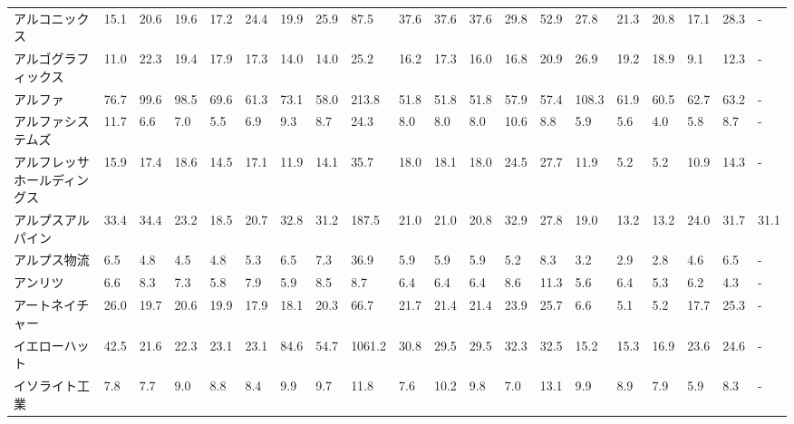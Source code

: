 \begin{tabular}{llllllllllllllllllll}
アルコニックス         &   15.1 &   20.6 &      19.6 &      17.2 &       24.4 &    19.9 &    25.9 &     87.5 &    37.6 &    37.6 &   37.6 &   29.8 &    52.9 &    27.8 &    21.3 &   20.8 &   17.1 &    28.3 &      - \\
アルゴグラフィックス      &   11.0 &   22.3 &      19.4 &      17.9 &       17.3 &    14.0 &    14.0 &     25.2 &    16.2 &    17.3 &   16.0 &   16.8 &    20.9 &    26.9 &    19.2 &   18.9 &    9.1 &    12.3 &      - \\
アルファ            &   76.7 &   99.6 &      98.5 &      69.6 &       61.3 &    73.1 &    58.0 &    213.8 &    51.8 &    51.8 &   51.8 &   57.9 &    57.4 &   108.3 &    61.9 &   60.5 &   62.7 &    63.2 &      - \\
アルファシステムズ       &   11.7 &    6.6 &       7.0 &       5.5 &        6.9 &     9.3 &     8.7 &     24.3 &     8.0 &     8.0 &    8.0 &   10.6 &     8.8 &     5.9 &     5.6 &    4.0 &    5.8 &     8.7 &      - \\
アルフレッサ　ホールディングス &   15.9 &   17.4 &      18.6 &      14.5 &       17.1 &    11.9 &    14.1 &     35.7 &    18.0 &    18.1 &   18.0 &   24.5 &    27.7 &    11.9 &     5.2 &    5.2 &   10.9 &    14.3 &      - \\
アルプスアルパイン       &   33.4 &   34.4 &      23.2 &      18.5 &       20.7 &    32.8 &    31.2 &    187.5 &    21.0 &    21.0 &   20.8 &   32.9 &    27.8 &    19.0 &    13.2 &   13.2 &   24.0 &    31.7 &   31.1 \\
アルプス物流          &    6.5 &    4.8 &       4.5 &       4.8 &        5.3 &     6.5 &     7.3 &     36.9 &     5.9 &     5.9 &    5.9 &    5.2 &     8.3 &     3.2 &     2.9 &    2.8 &    4.6 &     6.5 &      - \\
アンリツ            &    6.6 &    8.3 &       7.3 &       5.8 &        7.9 &     5.9 &     8.5 &      8.7 &     6.4 &     6.4 &    6.4 &    8.6 &    11.3 &     5.6 &     6.4 &    5.3 &    6.2 &     4.3 &      - \\
アートネイチャー        &   26.0 &   19.7 &      20.6 &      19.9 &       17.9 &    18.1 &    20.3 &     66.7 &    21.7 &    21.4 &   21.4 &   23.9 &    25.7 &     6.6 &     5.1 &    5.2 &   17.7 &    25.3 &      - \\
イエローハット         &   42.5 &   21.6 &      22.3 &      23.1 &       23.1 &    84.6 &    54.7 &   1061.2 &    30.8 &    29.5 &   29.5 &   32.3 &    32.5 &    15.2 &    15.3 &   16.9 &   23.6 &    24.6 &      - \\
イソライト工業         &    7.8 &    7.7 &       9.0 &       8.8 &        8.4 &     9.9 &     9.7 &     11.8 &     7.6 &    10.2 &    9.8 &    7.0 &    13.1 &     9.9 &     8.9 &    7.9 &    5.9 &     8.3 &      - \\

\end{tabular}
